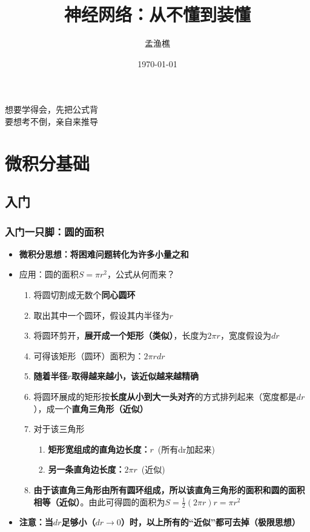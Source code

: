 \documentclass[UTF8]{ctexart}
\title{神经网络：从不懂到装懂}
\author{孟渔樵}
\date{\today}
\begin{document}
\maketitle
\begin{center} %
想要学得会，先把公式背 \\
要想考不倒，亲自来推导 \\
\end{center}

\newpage
\tableofcontents

\newpage
\section{微积分基础}
\subsection{入门}
\subsubsection{入门一只脚：圆的面积}
\begin{itemize}
	\item {\bfseries 微积分思想：将困难问题转化为许多小量之和}
	\item 应用：圆的面积$S = \pi r^2$，公式从何而来？ \begin{enumerate}
		\item 将圆切割成无数个{\bfseries 同心圆环}
		\item 取出其中一个圆环，假设其内半径为$r$
		\item 将圆环剪开，{\bfseries 展开成一个矩形（类似）}，长度为$2\pi r$，宽度假设为$dr$
		\item 可得该矩形（圆环）面积为：$2\pi rdr$
		\item {\bfseries 随着半径$r$取得越来越小，该近似越来越精确}
		\item 将圆环展成的矩形按{\bfseries 长度从小到大一头对齐}的方式排列起来（宽度都是$dr$），成一个{\bfseries 直角三角形（近似）}
		\item 对于该三角形\begin{enumerate}
			\item {\bfseries 矩形宽组成的直角边长度：}$r$\ (所有dr加起来)
			\item {\bfseries 另一条直角边长度：}$2\pi r$\ (近似)
		\end{enumerate}
		\item {\bfseries 由于该直角三角形由所有圆环组成，所以该直角三角形的面积和圆的面积相等（近似）}。由此可得圆的面积为$S=\frac{1}{2}(2\pi r) r = \pi r^2$
	\end{enumerate}
	\item {\bfseries 注意：当$dr$足够小（$dr\to0$）时，以上所有的“近似”都可去掉（极限思想）}
\end{itemize}
\end{document}
